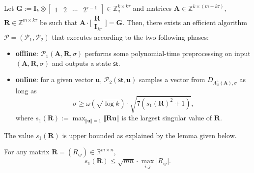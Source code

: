 \documentclass[runningheads]{llncs}
\begin{document}
\begin{theorem}\label{kk}
	Let $\mathbf{G}:=\mathbf{I}_k \otimes \begin{bmatrix}
	1& 2&\cdots& 2^{\tau-1} 
	\end{bmatrix} \in \mathbb{Z}_q^{k \times  k\tau}$ and matrices $\mathbf{A} \in \mathbb{Z}^{k \times (m+k\tau)}$,  $\mathbf{R}\in \mathbb{Z}^{m\times k \tau}$ be such that
	$\mathbf{A}\cdot \bigl[ \begin{smallmatrix}
	\mathbf{R}\\ \mathbf{I}_{k \tau}
	\end{smallmatrix} \bigr]=\mathbf{G}.$
Then, there exists an efficient algorithm $\mathcal{P}=(\mathcal{P}_1, \mathcal{P}_2)$ that executes according to the two following phases: 
\begin{itemize}
	\item \textbf{offline}: $\mathcal{P}_1(\mathbf{A}, \mathbf{R}, \sigma)$ performs some polynomial-time preprocessing on input $(\mathbf{A}, \mathbf{R}, \sigma)$ and outputs a state $\mathsf{st}$.
	\item \textbf{online}: for a given vector  $\mathbf{u}$, 
		$\mathcal{P}_2(\mathsf{st}, \mathbf{u})$ samples a vector from 
		$D_{\Lambda^{\bot}_{\textbf{u}}(\textbf{A}),\sigma}$ as long as
	\begin{equation}\label{k145}
	\sigma \geq \omega(\sqrt{\log k})\cdot \sqrt{7(s_1(\mathbf{R})^2+1)}, 
	\end{equation}
	 where $s_1(\mathbf{R}):=\max_{\Vert  \mathbf{u}\Vert=1} \Vert \mathbf{R} \mathbf{u}\Vert$ is the largest singular value of $\mathbf{R}$.
\end{itemize}
\end{theorem}
The value $s_1(\mathbf{R})$ is upper bounded as explained by the lemma given below.
\begin{lemma} \label{lem5}
	For any matrix $\mathbf{R}=(R_{ij}) \in \mathbb{R}^{m \times n}$,  \begin{equation}\label{k16}
	s_1(\mathbf{R}) \leq \sqrt{mn}\cdot \max_{i,j}\vert R_{ij}\vert.
	\end{equation}
	\end{lemma}
\end{document}
